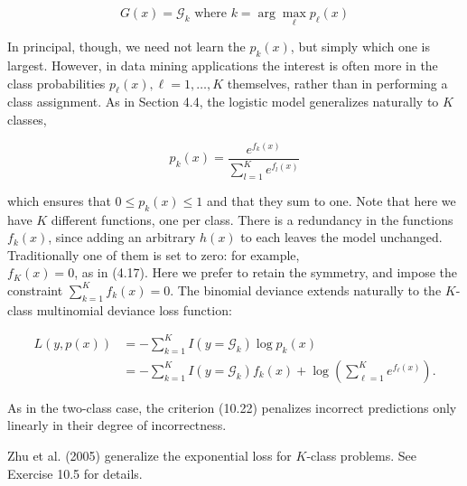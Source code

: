 \documentclass[10pt]{article}
\begin{document}
\begin{equation*}
G(x)=\mathcal{G}_{k} \text { where } k=\arg \max _{\ell} p_{\ell}(x) \tag{10.20}
\end{equation*}


In principal, though, we need not learn the $p_{k}(x)$, but simply which one is largest. However, in data mining applications the interest is often more in the class probabilities $p_{\ell}(x), \ell=1, \ldots, K$ themselves, rather than in performing a class assignment. As in Section 4.4, the logistic model generalizes naturally to $K$ classes,


\begin{equation*}
p_{k}(x)=\frac{e^{f_{k}(x)}}{\sum_{l=1}^{K} e^{f_{l}(x)}} \tag{10.21}
\end{equation*}


which ensures that $0 \leq p_{k}(x) \leq 1$ and that they sum to one. Note that here we have $K$ different functions, one per class. There is a redundancy in the functions $f_{k}(x)$, since adding an arbitrary $h(x)$ to each leaves the model unchanged. Traditionally one of them is set to zero: for example,\\
$f_{K}(x)=0$, as in (4.17). Here we prefer to retain the symmetry, and impose the constraint $\sum_{k=1}^{K} f_{k}(x)=0$. The binomial deviance extends naturally to the $K$-class multinomial deviance loss function:


\begin{align*}
L(y, p(x)) & =-\sum_{k=1}^{K} I\left(y=\mathcal{G}_{k}\right) \log p_{k}(x) \\
& =-\sum_{k=1}^{K} I\left(y=\mathcal{G}_{k}\right) f_{k}(x)+\log \left(\sum_{\ell=1}^{K} e^{f_{\ell}(x)}\right) . \tag{10.22}
\end{align*}


As in the two-class case, the criterion (10.22) penalizes incorrect predictions only linearly in their degree of incorrectness.

Zhu et al. (2005) generalize the exponential loss for $K$-class problems. See Exercise 10.5 for details.
\end{document}
